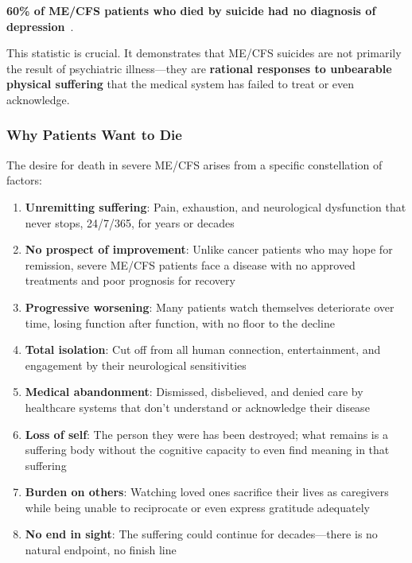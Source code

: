 \begin{observation}
\label{obs:suicide-no-depression}
\textbf{60\% of ME/CFS patients who died by suicide had no diagnosis of depression}~\cite{Roberts2016}.

This statistic is crucial. It demonstrates that ME/CFS suicides are not primarily the result of psychiatric illness---they are \textbf{rational responses to unbearable physical suffering} that the medical system has failed to treat or even acknowledge.
\end{observation}

\subsubsection{Why Patients Want to Die}
\label{subsec:why-death}

The desire for death in severe ME/CFS arises from a specific constellation of factors:

\begin{enumerate}
    \item \textbf{Unremitting suffering}: Pain, exhaustion, and neurological dysfunction that never stops, 24/7/365, for years or decades

    \item \textbf{No prospect of improvement}: Unlike cancer patients who may hope for remission, severe ME/CFS patients face a disease with no approved treatments and poor prognosis for recovery

    \item \textbf{Progressive worsening}: Many patients watch themselves deteriorate over time, losing function after function, with no floor to the decline

    \item \textbf{Total isolation}: Cut off from all human connection, entertainment, and engagement by their neurological sensitivities

    \item \textbf{Medical abandonment}: Dismissed, disbelieved, and denied care by healthcare systems that don't understand or acknowledge their disease

    \item \textbf{Loss of self}: The person they were has been destroyed; what remains is a suffering body without the cognitive capacity to even find meaning in that suffering

    \item \textbf{Burden on others}: Watching loved ones sacrifice their lives as caregivers while being unable to reciprocate or even express gratitude adequately

    \item \textbf{No end in sight}: The suffering could continue for decades---there is no natural endpoint, no finish line
\end{enumerate}

